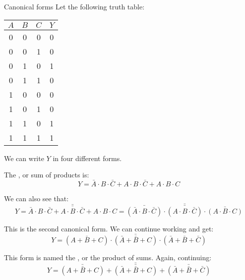 \documentclass[a4paper]{article}
\begin{document}
\begin{parag}{Canonical forms}
    Let the following truth table:
    \begin{center}
        \begin{tabular}{c|c|c|c}
            $A$ & $B$ & $C$ & $Y$ \\
            \hline
            0 & 0 & 0 & 0 \\
            0 & 0 & 1 & 0 \\
            0 & 1 & 0 & 1 \\
            0 & 1 & 1 & 0 \\
            1 & 0 & 0 & 0 \\
            1 & 0 & 1 & 0 \\
            1 & 1 & 0 & 1 \\
            1 & 1 & 1 & 1 \\
        \end{tabular}
    \end{center}

    We can write $Y$ in four different forms. 

    The , or sum of products is:
    \[Y = \bar{A} \cdot B \cdot \bar{C} + A \cdot B \cdot \bar{C} + A \cdot B \cdot C\]

    We can also see that: 
    \[Y = \bar{\bar{\bar{A} \cdot B \cdot \bar{C} + A \cdot B \cdot \bar{C} + A \cdot B \cdot C}} = \bar{\bar{\left(\bar{A} \cdot B \cdot \bar{C}\right)} \cdot \bar{\left(A \cdot B \cdot \bar{C}\right)} \cdot \bar{\left(A \cdot B \cdot C\right)}}\]

    This is the second canonical form. We can continue working and get: 
    \[Y = \bar{\left(A + \bar{B} + C\right) \cdot \left(\bar{A} + \bar{B} + C\right) \cdot \left(\bar{A} + \bar{B} + \bar{C}\right)}\]

    This form is named the , or the product of sums. Again, continuing: 
    \[Y = \bar{\bar{\left(A + \bar{B} + C\right)} + \bar{\left(\bar{A} + \bar{B} + C\right)} + \bar{\left(\bar{A} + \bar{B} + \bar{C}\right)}}\]
\end{parag}
\end{document}
